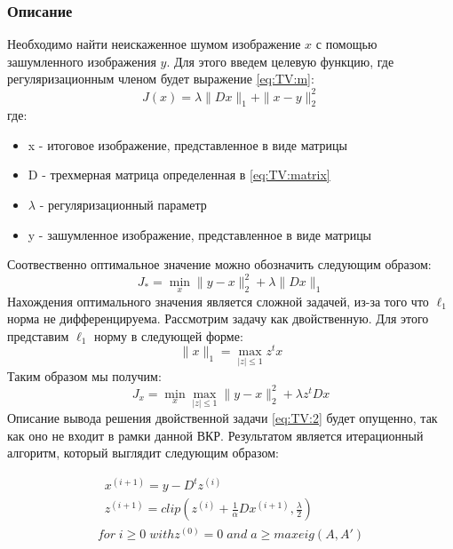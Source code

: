 \subsubsection{Описание}
Необходимо найти неискаженное шумом изображение $x$ с помощью зашумленного изображения $y$. Для этого введем целевую функцию, где регуляризационным членом будет выражение \ref{eq:TV:m}:
\begin{equation}
J(x) = \lambda \parallel D x \parallel_1+\parallel x-y\parallel_2^2
\end{equation}
где:
\begin{itemize}
	\item x - итоговое изображение, представленное в виде матрицы
	\item D - трехмерная матрица определенная в \ref{eq:TV:matrix}
	\item $\lambda$ - регуляризационный параметр 
	\item y - зашумленное изображение, представленное в виде матрицы 
\end{itemize}
Соотвественно оптимальное значение можно обозначить следующим образом:
\begin{equation}
J_* = \min_x \parallel y-x\parallel^2_2 + \lambda\parallel Dx\parallel_1
\end{equation}
Нахождения оптимального значения является сложной задачей, из-за того что $\ell_1$ норма не дифференцируема. Рассмотрим задачу как двойственную.
Для этого представим $\ell_1$ норму в следующей форме:
\begin{equation}
	\parallel x \parallel_1 = \max_{|z| \le 1}z^tx
\end{equation}
Таким образом мы получим:
\begin{equation}\label{eq:TV:2}
	J_x=\min_x\max_{|z| \le 1}\parallel y-x \parallel_2^2+\lambda z^t Dx
\end{equation}
Описание вывода решения двойственной задачи \ref{eq:TV:2} будет опущенно, так как оно не входит в рамки данной ВКР. Результатом является итерационный алгоритм, который выглядит следующим образом:
\begin{fleqns}
\begin{gather*}
\;\;x^{(i+1)}=y-D^tz^{(i)} \\
\;\;z^{(i+1)}=clip(z^{(i)} + \frac{1}{\alpha}Dx^{(i+1)}, \frac{\lambda}{2})\\
for  \;i \ge 0 \; with z^{(0)}=0\; and\;a\ge maxeig(A,A')
\end{gather*}
\end{fleqns}



